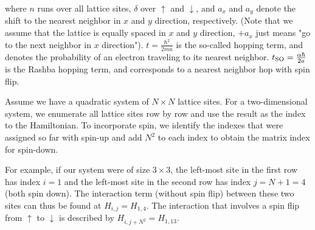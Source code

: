 \documentclass[11pt,twoside]{book}
\newcommand{\tso}{\ensuremath{t_{\textnormal{SO}}}}
\begin{document}
where $n$ runs over all lattice sites, $\delta$ over $\uparrow$ and
$\downarrow$, and $a_x$ and $a_y$ denote the shift to the nearest neighbor in
$x$ and $y$ direction, respectively. (Note that we assume that the lattice is
equally spaced in $x$ and $y$ direction, $+a_x$ just means "go to the next
neighbor in $x$ direction"). $t = \frac{\hbar^2}{2ma}$ is the so-called hopping term, and denotes the
probability of an electron traveling to its nearest neighbor.
$\tso = \frac{\alpha \hbar}{2a}$ is the
Rashba hopping term, and corresponds to a nearest neighbor hop with spin
flip.

Assume we have a quadratic system of $N \times N$ lattice sites.
For a two-dimensional system, we enumerate all lattice sites row by row and
use the result as the index to the Hamiltonian. To incorporate spin, we
identify the indexes that were assigned so far with spin-up and add $N^2$ to
each index to obtain the matrix index for spin-down.

For example, if our system were of size $3 \times 3$, the left-most site in the
first row has index $i = 1$ and the left-most site in the second row has
index $j = N + 1 = 4$ (both spin down). The interaction term (without spin
flip) between these two sites can thus be found at $H_{i,j} = H_{1,4}$. The
interaction that involves a spin flip from $\uparrow$ to $\downarrow$ is
described by $H_{i, j+N^2} = H_{1, 13}$.
\end{document}
